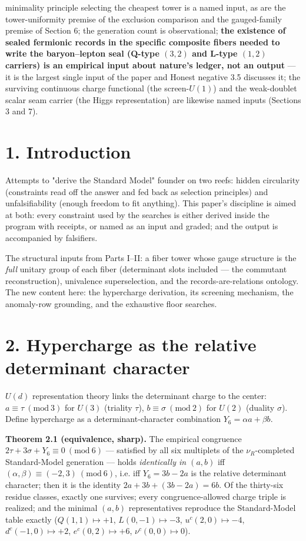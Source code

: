 \documentclass[11pt]{article}
\begin{document}
minimality principle selecting the cheapest tower is a named input, as are the tower-uniformity premise of the exclusion comparison and the gauged-family premise of Section 6; the generation count is observational; \textbf{the existence of sealed fermionic records in the specific composite fibers needed to write the baryon–lepton seal (Q-type $(3,2)$ and L-type $(1,2)$ carriers) is an empirical input about nature's ledger, not an output} — it is the largest single input of the paper and Honest negative 3.5 discusses it; the surviving continuous charge functional (the screen-$U(1)$) and the weak-doublet scalar seam carrier (the Higgs representation) are likewise named inputs (Sections 3 and 7).

\section*{1. Introduction}
Attempts to "derive the Standard Model" founder on two reefs: hidden circularity (constraints read off the answer and fed back as selection principles) and unfalsifiability (enough freedom to fit anything).  This paper's discipline is aimed at both: every constraint used by the searches is either derived inside the program with receipts, or named as an input and graded; and the output is accompanied by falsifiers.

The structural inputs from Parts I–II: a fiber tower whose gauge structure is the \emph{full} unitary group of each fiber (determinant slots included — the commutant reconstruction), univalence superselection, and the records-are-relations ontology.  The new content here: the hypercharge derivation, its screening mechanism, the anomaly-row grounding, and the exhaustive floor searches.

\section*{2. Hypercharge as the relative determinant character}
$U(d)$ representation theory links the determinant charge to the center: $a \equiv \tau \ (\mathrm{mod}\ 3)$ for $U(3)$ (triality $\tau$), $b \equiv \sigma\ (\mathrm{mod}\ 2)$ for $U(2)$ (duality $\sigma$).  Define hypercharge as a determinant-character combination $Y_6 = \alpha a + \beta b$.

\textbf{Theorem 2.1 (equivalence, sharp).}  The empirical congruence $2\tau + 3\sigma + Y_6 \equiv 0 \ (\mathrm{mod}\ 6)$ — satisfied by all six multiplets of the $\nu_R$-completed Standard-Model generation — holds \emph{identically in $(a,b)$} iff $(\alpha, \beta) \equiv (-2, 3) \ (\mathrm{mod}\ 6)$, i.e. iff $Y_6 = 3b - 2a$ is the relative determinant character; then it is the identity $2a + 3b + (3b - 2a) = 6b$.  Of the thirty-six residue classes, exactly one survives; every congruence-allowed charge triple is realized; and the minimal $(a,b)$ representatives reproduce the Standard-Model table exactly ($Q(1,1)\mapsto +1$, $L(0,-1)\mapsto -3$, $u^c(2,0)\mapsto -4$, $d^c(-1,0)\mapsto +2$, $e^c(0,2)\mapsto +6$, $\nu^c(0,0)\mapsto 0$).
\end{document}
